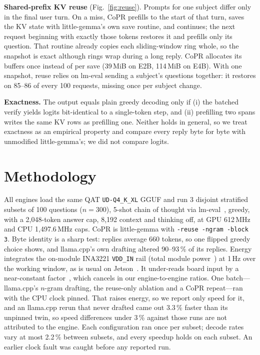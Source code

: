 \documentclass[lettersize,journal]{IEEEtran}
\newcommand{\sys}{CoPR}
\newcommand{\lc}{llama.cpp}
\newcommand{\lgm}{little-gemma}
\begin{document}
\textbf{Shared-prefix KV reuse} (Fig.~\ref{fig:reuse}). Prompts for one subject differ only in the final
user turn. On a miss, \sys{} prefills to the start of that turn, saves the KV state
with \lgm{}'s own save routine, and continues; the next request beginning with
exactly those tokens restores it and prefills only its question. That routine
already copies each sliding-window ring whole, so the snapshot is exact although
rings wrap during a long reply. \sys{} allocates its buffers once instead of per
save (39\,MiB on E2B, 114\,MiB on E4B). With one snapshot, reuse relies on
lm-eval sending a subject's questions together: it restores on 85--86 of every
100 requests, missing once per subject change.

\textbf{Exactness.} The output equals plain greedy decoding only if (i) the batched
verify yields logits bit-identical to a single-token step, and (ii) prefilling two
spans writes the same KV rows as prefilling one. Neither holds in general, so we
treat exactness as an empirical property and compare every reply byte for byte
with unmodified \lgm{}'s; we did not compare logits.

\section{Methodology}\label{sec:method}
All engines load the same QAT \texttt{UD-Q4\_K\_XL} GGUF and run 3 disjoint
stratified subsets of 100 questions ($n{=}300$), 5-shot chain of thought via
lm-eval~\cite{lmeval}, greedy, with a 2{,}048-token answer cap, 8{,}192 context and
thinking off, at GPU 612\,MHz and CPU 1{,}497.6\,MHz caps. \sys{} is \lgm{} with
\texttt{-reuse -ngram -block 3}. Byte
identity is a sharp test: replies average 660 tokens, so one flipped greedy
choice shows, and \lc{}'s own drafting altered 90--93\,\% of its replies. Energy
integrates the on-module INA3221 \texttt{VDD\_IN} rail (total module
power~\cite{nvjetsonpower}) at 1\,Hz over the working window, as is usual on
Jetson~\cite{zhan2026,liao2026}. It under-reads board input by a near-constant
factor~\cite{shalavi2023,liao2026}, which cancels in our engine-to-engine
ratios. One batch---\lc{}'s $n$-gram drafting, the
reuse-only ablation and a \sys{} repeat---ran with the CPU clock pinned. That
raises energy, so we report only speed for it, and an \lc{} rerun that never
drafted came out 3.3\,\% faster than its unpinned twin, so speed differences
under 3\,\% against those runs are not attributed to the engine. Each
configuration ran once per subset; decode rates vary at most 2.2\,\% between
subsets, and every speedup holds on each subset. An earlier clock fault was
caught before any reported run.
\end{document}
